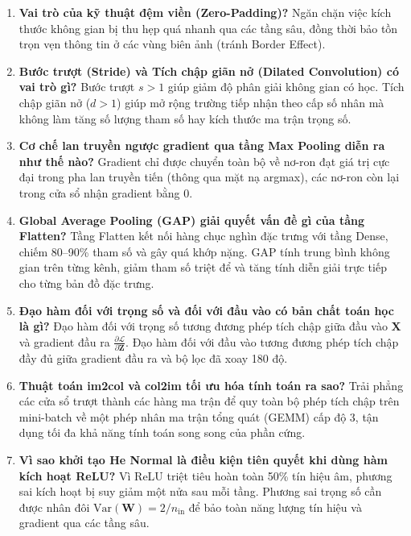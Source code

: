 \documentclass[12pt,a4paper]{report}
\begin{document}
\begin{enumerate}[label=\textbf{\arabic*.}]
    \item \textbf{Vai trò của kỹ thuật đệm viền (Zero-Padding)?}
    Ngăn chặn việc kích thước không gian bị thu hẹp quá nhanh qua các tầng sâu, đồng thời bảo tồn trọn vẹn thông tin ở các vùng biên ảnh (tránh Border Effect).
    
    \item \textbf{Bước trượt (Stride) và Tích chập giãn nở (Dilated Convolution) có vai trò gì?}
    Bước trượt $s > 1$ giúp giảm độ phân giải không gian có học. Tích chập giãn nở ($d > 1$) giúp mở rộng trường tiếp nhận theo cấp số nhân mà không làm tăng số lượng tham số hay kích thước ma trận trọng số.
    
    \item \textbf{Cơ chế lan truyền ngược gradient qua tầng Max Pooling diễn ra như thế nào?}
    Gradient chỉ được chuyển toàn bộ về nơ-ron đạt giá trị cực đại trong pha lan truyền tiến (thông qua mặt nạ argmax), các nơ-ron còn lại trong cửa sổ nhận gradient bằng 0.
    
    \item \textbf{Global Average Pooling (GAP) giải quyết vấn đề gì của tầng Flatten?}
    Tầng Flatten kết nối hàng chục nghìn đặc trưng với tầng Dense, chiếm 80--90\% tham số và gây quá khớp nặng. GAP tính trung bình không gian trên từng kênh, giảm tham số triệt để và tăng tính diễn giải trực tiếp cho từng bản đồ đặc trưng.
    
    \item \textbf{Đạo hàm đối với trọng số và đối với đầu vào có bản chất toán học là gì?}
    Đạo hàm đối với trọng số tương đương phép tích chập giữa đầu vào $\mathbf{X}$ và gradient đầu ra $\frac{\partial \mathcal{L}}{\partial \mathbf{Z}}$. Đạo hàm đối với đầu vào tương đương phép tích chập đầy đủ giữa gradient đầu ra và bộ lọc đã xoay 180 độ.
    
    \item \textbf{Thuật toán im2col và col2im tối ưu hóa tính toán ra sao?}
    Trải phẳng các cửa sổ trượt thành các hàng ma trận để quy toàn bộ phép tích chập trên mini-batch về một phép nhân ma trận tổng quát (GEMM) cấp độ 3, tận dụng tối đa khả năng tính toán song song của phần cứng.
    
    \item \textbf{Vì sao khởi tạo He Normal là điều kiện tiên quyết khi dùng hàm kích hoạt ReLU?}
    Vì ReLU triệt tiêu hoàn toàn 50\% tín hiệu âm, phương sai kích hoạt bị suy giảm một nửa sau mỗi tầng. Phương sai trọng số cần được nhân đôi $\text{Var}(\mathbf{W}) = 2/n_{\text{in}}$ để bảo toàn năng lượng tín hiệu và gradient qua các tầng sâu.
    

\end{enumerate}
\end{document}
